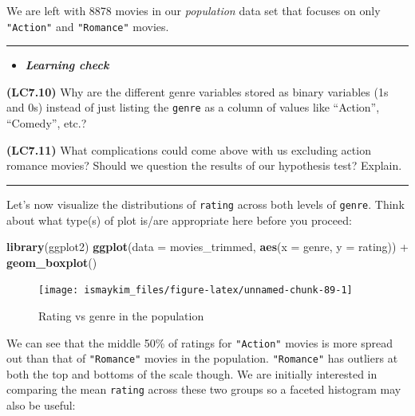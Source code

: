 \documentclass[]{tufte-book}
\newenvironment{Shaded}{\begin{snugshade}}{\end{snugshade}}
\newcommand{\KeywordTok}[1]{\textcolor[rgb]{0.13,0.29,0.53}{\textbf{{#1}}}}
\newcommand{\DataTypeTok}[1]{\textcolor[rgb]{0.13,0.29,0.53}{{#1}}}
\newcommand{\StringTok}[1]{\textcolor[rgb]{0.31,0.60,0.02}{{#1}}}
\newcommand{\NormalTok}[1]{{#1}}
\let\oldrule=\rule
\renewcommand{\rule}[1]{\oldrule{\linewidth}}
\newenvironment{rmdblock}[1]
  {\begin{shaded*}
  \begin{itemize}
  \renewcommand{\labelitemi}{
    \raisebox{-.7\height}[0pt][0pt]{
    }
  }
  \item
  }
  {
  \end{itemize}
  \end{shaded*}
  }
\newenvironment{learncheck}
  {\begin{rmdblock}{warning}}
  {\end{rmdblock}}
\begin{document}
We are left with 8878 movies in our \emph{population} data set that
focuses on only \texttt{"Action"} and \texttt{"Romance"} movies.

\begin{center}\rule{0.5\linewidth}{\linethickness}\end{center}

\begin{learncheck}
\textbf{\emph{Learning check}}
\end{learncheck}

\textbf{(LC7.10)} Why are the different genre variables stored as binary
variables (1s and 0s) instead of just listing the \texttt{genre} as a
column of values like ``Action'', ``Comedy'', etc.?

\textbf{(LC7.11)} What complications could come above with us excluding
action romance movies? Should we question the results of our hypothesis
test? Explain.

\begin{center}\rule{0.5\linewidth}{\linethickness}\end{center}

Let's now visualize the distributions of \texttt{rating} across both
levels of \texttt{genre}. Think about what type(s) of plot is/are
appropriate here before you proceed:

\begin{Shaded}
\begin{Highlighting}[]
\KeywordTok{library}\NormalTok{(ggplot2)}
\KeywordTok{ggplot}\NormalTok{(}\DataTypeTok{data =} \NormalTok{movies_trimmed, }\KeywordTok{aes}\NormalTok{(}\DataTypeTok{x =} \NormalTok{genre, }\DataTypeTok{y =} \NormalTok{rating)) +}
\StringTok{  }\KeywordTok{geom_boxplot}\NormalTok{()}
\end{Highlighting}
\end{Shaded}

\begin{figure}

{\centering \texttt{[image: ismaykim\_files/figure-latex/unnamed-chunk-89-1]} 

}

\caption[Rating vs genre in the population]{Rating vs genre in the population}\label{fig:unnamed-chunk-89}
\end{figure}

We can see that the middle 50\% of ratings for \texttt{"Action"} movies
is more spread out than that of \texttt{"Romance"} movies in the
population. \texttt{"Romance"} has outliers at both the top and bottoms
of the scale though. We are initially interested in comparing the mean
\texttt{rating} across these two groups so a faceted histogram may also
be useful:
\end{document}
